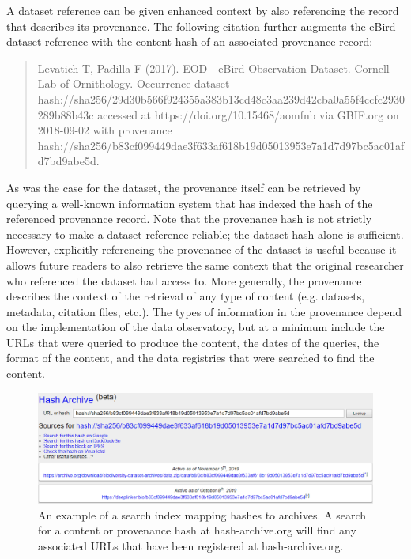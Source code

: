 \documentclass[10pt,letterpaper]{article}
\begin{document}
A dataset reference can be given enhanced context by also referencing the record that describes its provenance. The following citation further augments the eBird dataset reference with the content hash of an associated provenance record:

\begin{quote}
    Levatich T, Padilla F (2017). EOD - eBird Observation Dataset. Cornell Lab of Ornithology. Occurrence dataset hash://sha256/29d30b566f924355a383b13cd48c3aa239d42cba0a55f4ccfc2930289b88b43c accessed at https://doi.org/10.15468/aomfnb via GBIF.org on 2018-09-02 with provenance hash://sha256/b83cf099449dae3f633af618b19d05013953e7a1d7d97bc5ac01afd7bd9abe5d.
\end{quote}

As was the case for the dataset, the provenance itself can be retrieved by querying a well-known information system that has indexed the hash of the referenced provenance record. Note that the provenance hash is not strictly necessary to make a dataset reference reliable; the dataset hash alone is sufficient. However, explicitly referencing the provenance of the dataset is useful because it allows future readers to also retrieve the same context that the original researcher who referenced the dataset had access to. More generally, the provenance describes the context of the retrieval of any type of content (e.g. datasets, metadata, citation files, etc.). The types of information in the provenance depend on the implementation of the data observatory, but at a minimum include the URLs that were queried to produce the content, the dates of the queries, the format of the content, and the data registries that were searched to find the content.

\begin{figure}[ht] %


\includegraphics[width=\textwidth]{fig5.png}

\caption{An example of a search index mapping hashes to archives. A search for a content or provenance hash at hash-archive.org will find any associated URLs that have been registered at hash-archive.org.}

\label{fig5} %

\end{figure}
\end{document}
